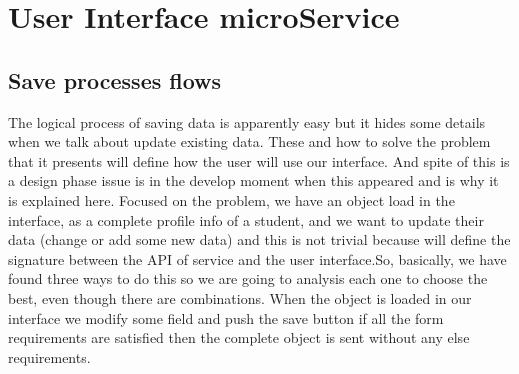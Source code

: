 \section{User Interface microService}



\subsection{Save processes flows}

The logical process of saving data is apparently easy but it hides some details
when we talk about update existing data. These and how to solve the problem that
it presents will define how the user will use our interface. And spite of this is
a design phase issue is in the develop moment when this appeared and is why it
is explained here.
\linebreak
\linebreak
\noindent Focused on the problem, we have an object load in the interface, as a complete
profile info of a student, and we want to update their data (change or add some
new data) and this is not trivial because will define the signature between the
API of service and the user interface.So, basically, we have found three ways to do this so we are going to analysis
each one to choose the best, even though there are combinations.
When the object is loaded in our interface we modify some field and push the save
button if all the form requirements are satisfied then the complete object is sent
without any else requirements.


